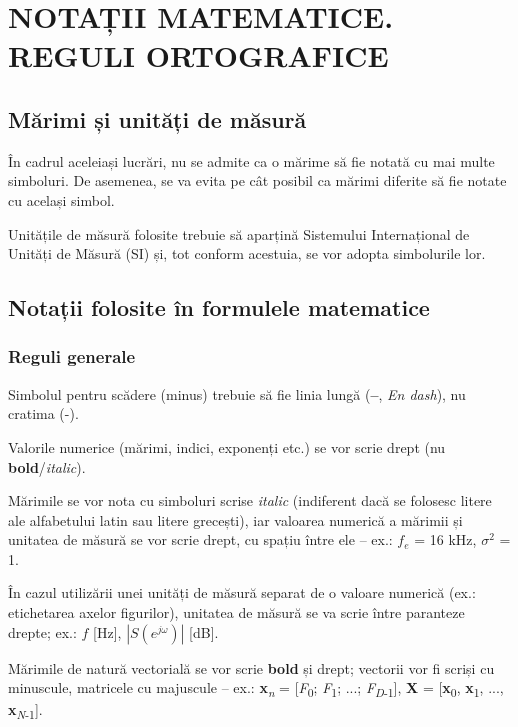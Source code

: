 \chapter{NOTAȚII MATEMATICE. REGULI ORTOGRAFICE}

\section{Mărimi și unități de măsură}

În cadrul aceleiași lucrări, nu se admite ca o mărime să fie notată cu mai multe simboluri. De asemenea, se va evita pe cât posibil ca mărimi diferite să fie notate cu același simbol.

Unitățile de măsură folosite trebuie să aparțină Sistemului Internațional de Unități de Măsură (SI) și, tot conform acestuia, se vor adopta simbolurile lor.


\section{Notații folosite în formulele matematice}

\subsection{Reguli generale}

Simbolul pentru scădere (minus) trebuie să fie linia lungă (\textbf{--}, \textit{En dash}), nu cratima (-).

Valorile numerice (mărimi, indici, exponenți etc.) se vor scrie drept (nu \textbf{bold}/\textit{italic}).

Mărimile se vor nota cu simboluri scrise \textit{italic} (indiferent dacă se folosesc litere ale alfabetului latin sau litere grecești), iar valoarea numerică a mărimii și unitatea de măsură se vor scrie drept, cu spațiu între ele – ex.: $f_e$ = 16 kHz, $\sigma^2$ = 1.

În cazul utilizării unei unități de măsură separat de o valoare numerică (ex.: etichetarea axelor figurilor), unitatea de măsură se va scrie între paranteze drepte; ex.: $f$ [Hz], $|S(e^{j\omega})|$ [dB].

Mărimile de natură vectorială se vor scrie \textbf{bold} și drept; vectorii vor fi scriși cu minuscule, matricele cu majuscule – ex.: \textbf{x}\textsubscript{\textit{n}} = [\textit{F}\textsubscript{0}; \textit{F}\textsubscript{1}; ...; \textit{F}\textsubscript{\textit{D}-1}], \textbf{X} = [\textbf{x}\textsubscript{0}, \textbf{x}\textsubscript{1}, ..., \textbf{x}\textsubscript{\textit{N}-1}].


